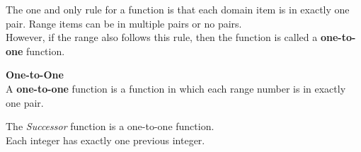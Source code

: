 \documentclass{ximera}
\begin{document}
The one and only rule for a function is that each domain item is in exactly one pair.  Range items can be in multiple pairs or no pairs. \\

However, if the range also follows this rule, then the function is called a \textbf{one-to-one} function.






\begin{definition} \textbf{\textcolor{green!50!black}{One-to-One}} \\

A \textbf{one-to-one} function is a function in which each range number is in exactly one pair.

\end{definition}



\begin{example}

The \textit{Successor} function is a one-to-one function. \\

Each integer has exactly one previous integer.

\end{example}
\end{document}
